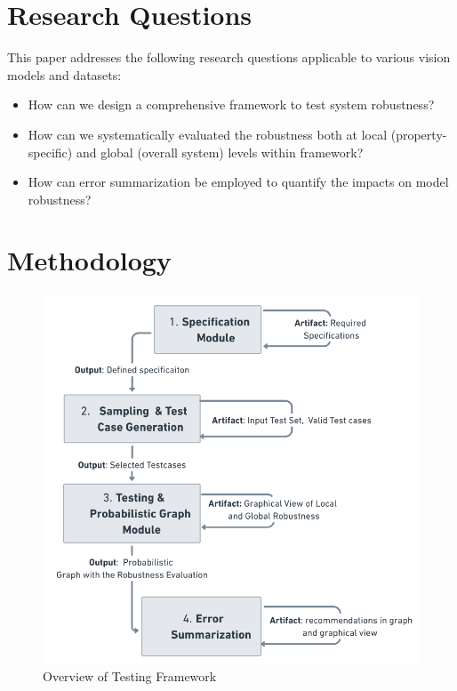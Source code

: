 \documentclass[10pt, conference, a4paper, final]{IEEEtran}
\begin{document}
\section{Research Questions}

This paper addresses the following research questions applicable to various vision models and datasets:

\begin{itemize}
    \item How can we design a comprehensive framework to test system robustness?
    \item How can we systematically evaluated the robustness both at local (property-specific) and global (overall system) levels within framework?
    \item How can error summarization be employed to quantify the impacts on model robustness?
 
\end{itemize}


\section{Methodology}
\begin{figure}{}
    \centering
    \includegraphics[width=\linewidth]{paper_images/framework.png}
    \caption{Overview of Testing Framework}
    \label{fig:graph}
\end{figure}
\end{document}
